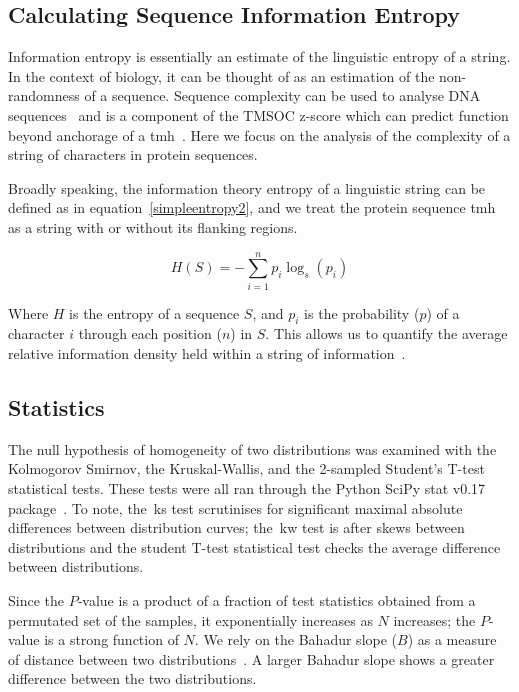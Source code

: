 \subsection{Calculating Sequence Information Entropy}
Information entropy is essentially an estimate of the linguistic entropy of a string.
In the context of biology, it can be thought of as an estimation of the non-randomness of a sequence.
Sequence complexity can be used to analyse DNA sequences~\cite{Pinho2013, Oliver1993, Troyanskaya2002} and is a component of the TMSOC z-score which can predict function beyond anchorage of a \gls{tmh}~\cite{Wong2011, Wong2012, Baker2017}.
Here we focus on the analysis of the complexity of a string of characters in protein sequences.

Broadly speaking, the information theory entropy of a linguistic string can be defined as in equation~\ref{simpleentropy2}, and we treat the protein sequence \gls{tmh} as a string with or without its flanking regions.

\begin{equation} \label{simpleentropy2}
    H(S)=-{\sum_{i=1}^n {p_i\log_s(p_i)}}
\end{equation}

Where $H$ is the entropy of a sequence $S$, and $p_i$ is the probability ($p$) of a character $i$ through each position ($n$) in $S$. This allows us to quantify the average relative information density held within a string of information~\cite{Shannon1948}.

\subsection{Statistics}

The null hypothesis of homogeneity of two distributions was examined with the Kolmogorov Smirnov, the Kruskal-Wallis, and the 2-sampled Student's T-test statistical tests.
These tests were all ran through the Python SciPy stat v0.17 package~\cite{VanderWalt2011}.
To note, the~\gls{ks} test scrutinises for significant maximal absolute differences between distribution curves; the~\gls{kw} test is after skews between distributions and the student T-test statistical test checks the average difference between distributions.

Since the $P$\-‑value is a product of a fraction of test statistics obtained from a permutated set of the samples, it exponentially increases as $N$ increases; the $P$\--value is a strong function of $N$.
We rely on the Bahadur slope ($B$) as a measure of distance between two distributions~\cite{Bahadur1967, Bahadur1971, Sunyaev1998, Baker2017}. A larger Bahadur slope shows a greater difference between the two distributions.

